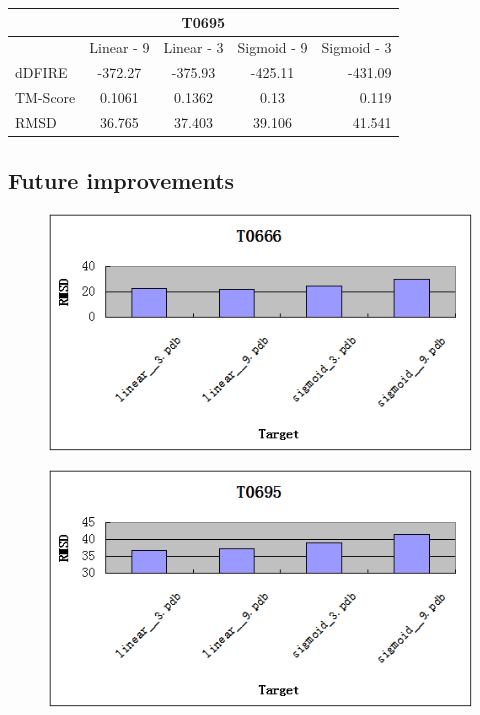 \documentclass{article}
\begin{document}
\begin{enumerate}
\begin{center}
\begin{tabular}{|l|c|c|c|r|}
\multicolumn{5}{c}{T0695} \\
    \hline
      & Linear - 9 & Linear - 3 & Sigmoid - 9 & Sigmoid - 3\\ \hline
    dDFIRE &  -372.27 & -375.93 & -425.11 & -431.09 \\ \hline
    TM-Score & 0.1061 & 0.1362 & 0.13 & 0.119 \\ \hline
    RMSD & 36.765 & 37.403 & 39.106 & 41.541 \\
    \hline
    \end{tabular}
\end{center}

\subsection{Future improvements}

\begin{figure}
\centering

\begin{minipage}{1.0\textwidth}
  \centering
  \includegraphics[width=.9\linewidth]{t0666}
  \label{fig:test1}
\end{minipage}%

\begin{minipage}{1.0\textwidth}
  \centering
  \includegraphics[width=.9\linewidth]{t0695}
  \label{fig:test2}
\end{minipage}


\end{figure}
\end{enumerate}
\end{document}
